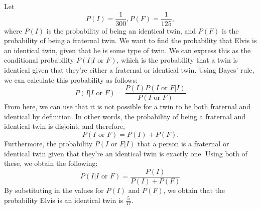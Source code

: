 \documentclass{article}
\begin{document}
	Let 
	\[
		P(I) = \frac{1}{300},
		P(F) = \frac{1}{125},
	\]
	where $P(I)$ is the probability of being an identical twin, and $P(F)$ is the probability of being a fraternal twin. We want to find the probability that Elvis is an identical twin, given that he is some type of twin. We can express this as the conditional probability $P(I|I \text{ or } F)$, which is the probability that a twin is identical given that they're either a fraternal or identical twin. Using Bayes' rule, we can calculate this probability as follows:
	\[
		P(I|I \text{ or } F) = \frac{P(I)P(I \text{ or } F|I)}{P(I \text{ or } F)}
	\]
	From here, we can use that it is not possible for a twin to be both fraternal and identical by definition. In other words, the probability of being a fraternal and identical twin is disjoint, and therefore,
	\[
		P(I \text{ or } F) = P(I) + P(F).
	\]
	Furthermore, the probability $P(I \text{ or } F|I)$ that a person is a fraternal or identical twin given that they're an identical twin is exactly one. Using both of these, we obtain the following:
	\[
		P(I|I \text{ or } F) = \frac{P(I)}{P(I) + P(F)}
	\]
	By substituting in the values for $P(I)$ and $P(F)$, we obtain that the probability Elvis is an identical twin is $\frac{5}{17}$.
\end{document}
